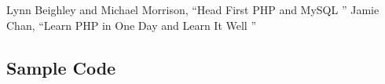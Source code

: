\documentclass{nascproject}
\begin{document}
\begin{thebibliography}{1}
\bibitem{}  Lynn Beighley and Michael Morrison, ``Head First PHP and MySQL '' 
\bibitem {} Jamie Chan, ``Learn PHP in One Day and Learn It Well ''

\end{thebibliography}

\begin{appendices}
\chapter{Sample Code}
\begin{lstlisting}[language=php]


\end{lstlisting}
\end{appendices}
\end{document}
